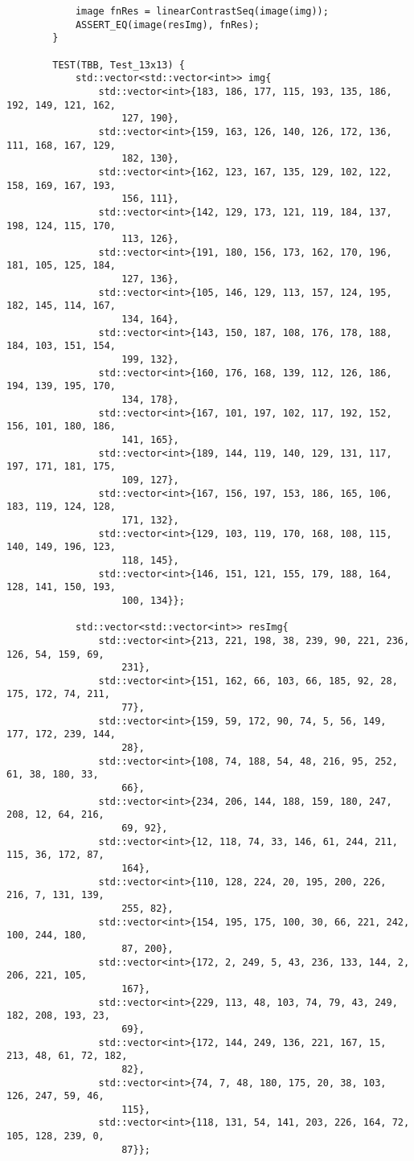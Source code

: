 \documentclass[14pt, russian]{extarticle}
\begin{document}
\begin{lstlisting}
			image fnRes = linearContrastSeq(image(img));
			ASSERT_EQ(image(resImg), fnRes);
		}
		
		TEST(TBB, Test_13x13) {
			std::vector<std::vector<int>> img{
				std::vector<int>{183, 186, 177, 115, 193, 135, 186, 192, 149, 121, 162,
					127, 190},
				std::vector<int>{159, 163, 126, 140, 126, 172, 136, 111, 168, 167, 129,
					182, 130},
				std::vector<int>{162, 123, 167, 135, 129, 102, 122, 158, 169, 167, 193,
					156, 111},
				std::vector<int>{142, 129, 173, 121, 119, 184, 137, 198, 124, 115, 170,
					113, 126},
				std::vector<int>{191, 180, 156, 173, 162, 170, 196, 181, 105, 125, 184,
					127, 136},
				std::vector<int>{105, 146, 129, 113, 157, 124, 195, 182, 145, 114, 167,
					134, 164},
				std::vector<int>{143, 150, 187, 108, 176, 178, 188, 184, 103, 151, 154,
					199, 132},
				std::vector<int>{160, 176, 168, 139, 112, 126, 186, 194, 139, 195, 170,
					134, 178},
				std::vector<int>{167, 101, 197, 102, 117, 192, 152, 156, 101, 180, 186,
					141, 165},
				std::vector<int>{189, 144, 119, 140, 129, 131, 117, 197, 171, 181, 175,
					109, 127},
				std::vector<int>{167, 156, 197, 153, 186, 165, 106, 183, 119, 124, 128,
					171, 132},
				std::vector<int>{129, 103, 119, 170, 168, 108, 115, 140, 149, 196, 123,
					118, 145},
				std::vector<int>{146, 151, 121, 155, 179, 188, 164, 128, 141, 150, 193,
					100, 134}};
			
			std::vector<std::vector<int>> resImg{
				std::vector<int>{213, 221, 198, 38, 239, 90, 221, 236, 126, 54, 159, 69,
					231},
				std::vector<int>{151, 162, 66, 103, 66, 185, 92, 28, 175, 172, 74, 211,
					77},
				std::vector<int>{159, 59, 172, 90, 74, 5, 56, 149, 177, 172, 239, 144,
					28},
				std::vector<int>{108, 74, 188, 54, 48, 216, 95, 252, 61, 38, 180, 33,
					66},
				std::vector<int>{234, 206, 144, 188, 159, 180, 247, 208, 12, 64, 216,
					69, 92},
				std::vector<int>{12, 118, 74, 33, 146, 61, 244, 211, 115, 36, 172, 87,
					164},
				std::vector<int>{110, 128, 224, 20, 195, 200, 226, 216, 7, 131, 139,
					255, 82},
				std::vector<int>{154, 195, 175, 100, 30, 66, 221, 242, 100, 244, 180,
					87, 200},
				std::vector<int>{172, 2, 249, 5, 43, 236, 133, 144, 2, 206, 221, 105,
					167},
				std::vector<int>{229, 113, 48, 103, 74, 79, 43, 249, 182, 208, 193, 23,
					69},
				std::vector<int>{172, 144, 249, 136, 221, 167, 15, 213, 48, 61, 72, 182,
					82},
				std::vector<int>{74, 7, 48, 180, 175, 20, 38, 103, 126, 247, 59, 46,
					115},
				std::vector<int>{118, 131, 54, 141, 203, 226, 164, 72, 105, 128, 239, 0,
					87}};
			

\end{lstlisting}
\end{document}

